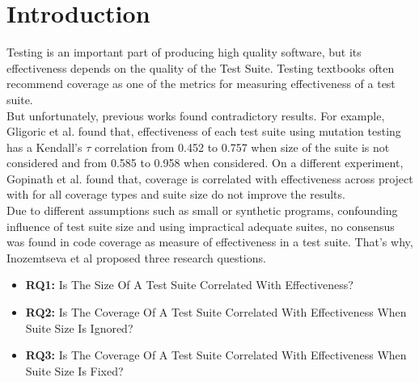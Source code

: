 \section{Introduction}
Testing is an important part of producing high quality software, but its effectiveness depends on the quality of the Test Suite. Testing textbooks often recommend coverage as one of the metrics for measuring effectiveness of a test suite. \\%
But unfortunately, previous works found contradictory results. For example, Gligoric et al. \cite{gligoric2015guidelines} found that, effectiveness of each test suite using mutation testing has a Kendall's $\tau$ correlation from 0.452 to 0.757 when size of the suite is not considered and from 0.585 to 0.958 when considered. On a different experiment, Gopinath et al. \cite{gopinath2014code} found that, coverage is correlated with effectiveness across project with for all coverage types and suite size do not improve the results. \\
Due to different assumptions such as small or synthetic programs, confounding influence of test suite size and using impractical adequate suites, no consensus was found in code coverage as measure of effectiveness in a test suite. That's why, Inozemtseva et al \cite{inozemtseva2014coverage} proposed three research questions.
\begin{itemize}
    \item \textbf{RQ1:} Is The Size Of A Test Suite Correlated With Effectiveness?
    \item \textbf{RQ2:} Is The Coverage Of A Test Suite Correlated With Effectiveness When Suite Size Is Ignored?
    \item \textbf{RQ3:} Is The Coverage Of A Test Suite Correlated With Effectiveness When Suite Size Is Fixed?
\end{itemize}



